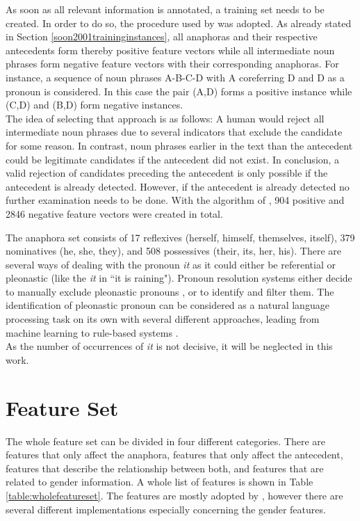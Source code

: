 As soon as all relevant information is annotated, a training set needs to be created. In order to do so, the procedure used by \cite{soon2001machine} was adopted. As already stated in Section \ref{soon2001traininginstances}, all anaphoras and their respective antecedents form thereby positive feature vectors while all intermediate noun phrases form negative feature vectors with their corresponding anaphoras. For instance, a sequence of noun phrases A-B-C-D with A coreferring D and D as a pronoun is considered. In this case the pair (A,D) forms a positive instance while (C,D) and (B,D) form negative instances.\\
The idea of selecting that approach is as follows: A human would reject all intermediate noun phrases due to several indicators that exclude the candidate for some reason. In contrast, noun phrases earlier in the text than the antecedent could be legitimate candidates if the antecedent did not exist. In conclusion, a valid rejection of candidates preceding the antecedent is only possible if the antecedent is already detected. However, if the antecedent is already detected no further examination needs to be done. With the algorithm of \cite{soon2001machine}, 904 positive and 2846 negative feature vectors were created in total.

The anaphora set consists of 17 reflexives (herself, himself, themselves, itself), 379 nominatives (he, she, they), and 508 possessives (their, its, her, his). There are several ways of dealing with the pronoun \textit{it} as it could either be referential or pleonastic (like the \textit{it} in ``it is raining"). Pronoun resolution systems either decide to manually exclude pleonastic pronouns \citep{kennedy1996anaphora,bergsma2005automatic}, or to identify and filter them. The identification of pleonastic pronoun can be considered as a natural language processing task on its own with several different approaches, leading from machine learning \citep{boyd2005identifying} to rule-based systems \citep{lappin1994algorithm}.\\
As the number of occurrences of \textit{it} is not decisive, it will be neglected in this work.


\section{Feature Set}
The whole feature set can be divided in four different categories. There are features that only affect the anaphora, features that only affect the antecedent, features that describe the relationship between both, and features that are related to gender information. A whole list of features is shown in Table \ref{table:wholefeatureset}. The features are mostly adopted by \cite{bergsma2005automatic}, however there are several different implementations especially concerning the gender features.

